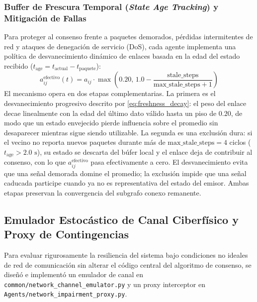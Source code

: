 \subsubsection{Buffer de Frescura Temporal (\textit{State Age Tracking}) y Mitigación de Fallas}
Para proteger al consenso frente a paquetes demorados, pérdidas intermitentes de red y ataques de denegación de servicio (DoS), cada agente implementa una política de desvanecimiento dinámico de enlaces basada en la edad del estado recibido ($t_{\text{age}} = t_{\text{actual}} - t_{\text{paquete}}$):
\begin{equation}\label{eq:freshness_decay}
a_{ij}^{\text{efectivo}}(t) = a_{ij} \cdot \max\left(0.20, \, 1.0 - \frac{\text{stale\_steps}}{\text{max\_stale\_steps} + 1} \right)
\end{equation}
El mecanismo opera en dos etapas complementarias. La primera es el desvanecimiento progresivo descrito por \eqref{eq:freshness_decay}: el peso del enlace decae linealmente con la edad del último dato válido hasta un piso de $0.20$, de modo que un estado envejecido pierde influencia sobre el promedio sin desaparecer mientras sigue siendo utilizable. La segunda es una exclusión dura: si el vecino no reporta nuevos paquetes durante más de $\text{max\_stale\_steps} = 4$ ciclos ($t_{\text{age}} > 2.0\text{ s}$), su estado se descarta del búfer local y el enlace deja de contribuir al consenso, con lo que $a_{ij}^{\text{efectivo}}$ pasa efectivamente a cero. El desvanecimiento evita que una señal demorada domine el promedio; la exclusión impide que una señal caducada participe cuando ya no es representativa del estado del emisor. Ambas etapas preservan la convergencia del subgrafo conexo remanente.

\subsection{Emulador Estocástico de Canal Ciberfísico y Proxy de Contingencias}

Para evaluar rigurosamente la resiliencia del sistema bajo condiciones no ideales de red de comunicación sin alterar el código central del algoritmo de consenso, se diseñó e implementó un emulador de canal en \texttt{common/network\_channel\_emulator.py} y un proxy interceptor en \texttt{Agents/network\_impairment\_proxy.py}.

